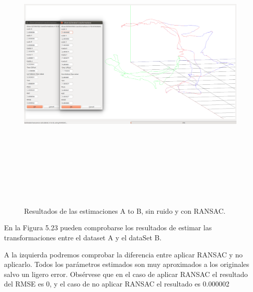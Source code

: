 \begin{figure}[H]
\begin{center}
\label{fig:opciones de View}\includegraphics[height=14.0cm,width=18.0cm]{img/cap6/newData_EscalaTraslaRota_aB.png}
\hspace{0.5cm}

\end{center}

\caption{Resultados de las estimaciones A to B, sin ruido y con RANSAC.}
\end{figure}
En la Figura 5.23 pueden comprobarse los resultados de estimar las transformaciones entre el dataset A y el dataSet B.

A la izquierda podremos comprobar la diferencia entre aplicar RANSAC y no aplicarlo. Todos los parámetros estimados son muy aproximados a los originales salvo un ligero error. Obsérvese que en el caso de aplicar RANSAC el resultado del RMSE es 0, y el caso de no aplicar RANSAC el resultado es 0.000002


